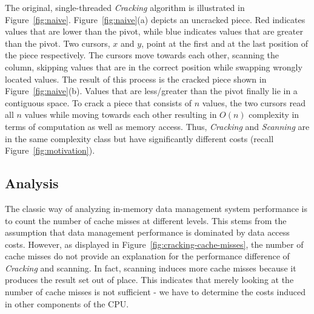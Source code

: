 The original, single-threaded \emph{Cracking} algorithm is illustrated
in Figure~\ref{fig:naive}.
Figure~\ref{fig:naive}(a) depicts an uncracked piece.  Red indicates
values that are lower than the pivot, while blue indicates values that
are greater than the pivot.  Two cursors, $x$ and $y$, point at the
first and at the last position of the piece respectively.  The cursors
move towards each other, scanning the column, skipping values that are
in the correct position while swapping wrongly located values.  The
result of this process is the cracked piece shown in
Figure~\ref{fig:naive}(b).  Values that are less/greater than the
pivot finally lie in a contiguous space.  To crack a piece that
consists of $n$ values, %
the two cursors read all $n$ values while moving towards each other
resulting in $O(n)$ complexity in terms of computation as well as
memory access.  Thus, \emph{Cracking} and \emph{Scanning} are in the
same complexity class but have significantly different costs (recall
Figure~\ref{fig:motivation}).


\subsection*{Analysis}
\label{sec:analysis}
The classic way of analyzing in-memory data management system
performance is to count the number of cache misses at different
levels. This stems from the assumption that data management
performance is dominated by data access costs. However, as displayed
in Figure~\ref{fig:cracking-cache-misses}, the number of cache misses
do not provide an explanation for the performance difference of
\emph{Cracking} and scanning. In fact, scanning induces more cache
misses because it produces the result set out of place. This indicates
that merely looking at the number of cache misses is not sufficient -
we have to determine the costs induced in other components of the CPU.

